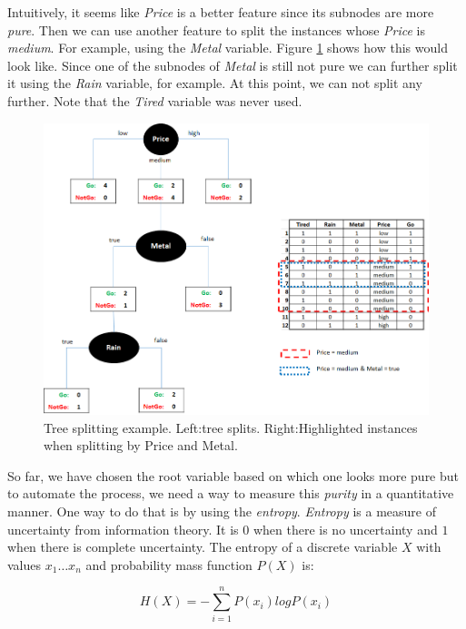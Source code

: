 \documentclass[
  11pt,
]{krantz}
\begin{document}
Intuitively, it seems like \emph{Price} is a better feature since its subnodes are more \emph{pure}. Then we can use another feature to split the instances whose \emph{Price} is \emph{medium}. For example, using the \emph{Metal} variable. Figure \ref{fig:treeAlgo2} shows how this would look like. Since one of the subnodes of \emph{Metal} is still not pure we can further split it using the \emph{Rain} variable, for example. At this point, we can not split any further. Note that the \emph{Tired} variable was never used.

\begin{figure}

{\centering \includegraphics[width=1\linewidth]{images/treeAlgo2} 

}

\caption{Tree splitting example. Left:tree splits. Right:Highlighted instances when splitting by Price and Metal.}\label{fig:treeAlgo2}
\end{figure}

So far, we have chosen the root variable based on which one looks more pure but to automate the process, we need a way to measure this \emph{purity} in a quantitative manner. One way to do that is by using the \emph{entropy}. \emph{Entropy} is a measure of uncertainty from information theory. It is \(0\) when there is no uncertainty and \(1\) when there is complete uncertainty. The entropy of a discrete variable \(X\) with values \(x_1\dots x_n\) and probability mass function \(P(X)\) is:

\begin{equation}
  H(X) = -\sum_{i=1}^n{P(x_i)log P(x_i)}
  \label{eq:entropy}
\end{equation}
\end{document}
